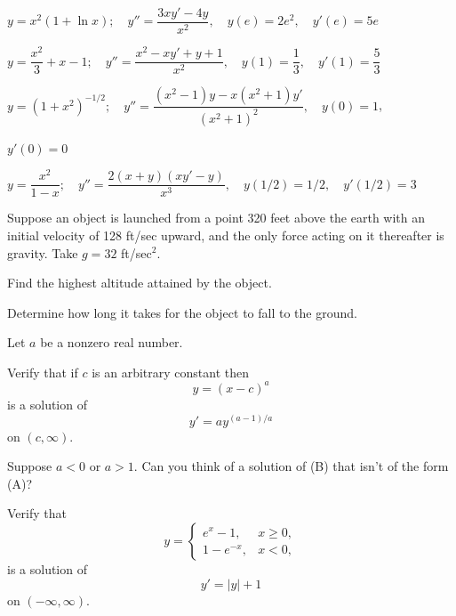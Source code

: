 \begin{exerciselist}
\begin{alist}
\item %
$y=x^2(1+\ln x);     \quad y''=\dfrac{3xy'-4y}{x^2}, \quad
y(e)=2e^2, \quad y'(e)=5e$

\item %
$y=\dfrac{x^2}{3}+x-1;     \quad y''=\dfrac{x^2-xy'+y+1}{x^2}, \quad y(1)=\dfrac{1}{3}, \quad y'(1)=\dfrac{5}{3}$

\item %
$y=(1+x^2)^{-1/2};     \quad
y''=\dfrac{(x^2-1)y-x(x^2+1)y'}{(x^2+1)^2}, \quad y(0)=1$,

$y'(0)=0$

\item %
$y=\dfrac{x^2}{1-x};    \quad y''=\dfrac{2(x+y)(xy'-y)}{x^3},
\quad y(1/2)=1/2, \quad y'(1/2)=3$
\end{alist}

\item\label{exer:1.2.7}Suppose an object is launched from a point 320 feet
above the earth with an initial velocity of 128 ft/sec
upward, and  the only force acting on it thereafter is
gravity. Take $g=32$ ft/sec$^2$.

\begin{alist}
\item %
Find the highest altitude attained by the object.

\item %
Determine how long it takes for the object to fall to the
ground.
\end{alist}

\item\label{exer:1.2.8}\setcounter{equation}{0}
Let $a$ be a nonzero real number.
\begin{alist}
\item %
Verify that if $c$ is an arbitrary constant then
\[
y=(x-c)^a\tag{A}
\]
is a solution of
\[
y'=ay^{(a-1)/a}\tag{B}
\]
on $(c,\infty)$.
\item %
Suppose $a<0$ or $a>1$. Can you think of a solution of
(B) that isn't of the form (A)?
\end{alist}

\item\label{exer:1.2.9}Verify that
\[
y=
\begin{cases}
e^x-1,& x \ge 0, \\
1-e^{-x},& x < 0,
\end{cases}
\]
is a solution of
\[
y'=|y|+1
\]
on $(-\infty,\infty)$. 


\end{exerciselist}
